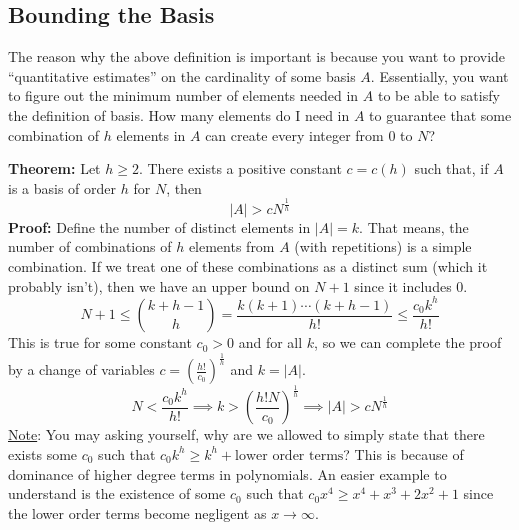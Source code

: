 \subsection{Bounding the Basis}
The reason why the above definition is important is because you want to provide ``quantitative estimates'' on the cardinality of some basis $A$. Essentially, you want to figure out the minimum number of elements needed in $A$ to be able to satisfy the definition of basis. How many elements do I need in $A$ to guarantee that some combination of $h$ elements in $A$ can create every integer from $0$ to $N$? 
\begin{boxedsection}
    \textbf{Theorem:} Let $h \geq 2$. There exists a positive constant $c = c(h)$ such that, if $A$ is a basis of order $h$ for $N$, then
    $$
    |A| > cN^{\frac{1}{h}}
    $$
    \textbf{Proof:} Define the number of distinct elements in $|A| = k$. That means, the number of combinations of $h$ elements from $A$ (with repetitions) is a simple combination. If we treat one of these combinations as a distinct sum (which it probably isn't), then we have an upper bound on $N+1$ since it includes $0$.
    $$
    N+1 \leq {k+h-1 \choose h} = \frac{k(k+1)\cdots(k+h-1)}{h!} \leq \frac{c_0k^h}{h!}
    $$
    This is true for some constant $c_0 > 0$ and for all $k$, so we can complete the proof by a change of variables $c = \left(\frac{h!}{c_0}\right)^{\frac{1}{h}}$ and $k = |A|$. 
    $$
    N < \frac{c_0k^h}{h!} \implies k > \left(\frac{h! N}{c_0}\right)^{\frac{1}{h}} \implies |A| > cN^{\frac{1}{h}}
    $$
    \underline{Note}: You may asking yourself, why are we allowed to simply state that there exists some $c_0$ such that $c_0k^h \geq k^h + \text{lower order terms}$? This is because of dominance of higher degree terms in polynomials. An easier example to understand is the existence of some $c_0$ such that $c_0 x^4 \geq x^4 + x^3 + 2x^2 + 1$ since the lower order terms become negligent as $x \rightarrow \infty$.
\end{boxedsection}
